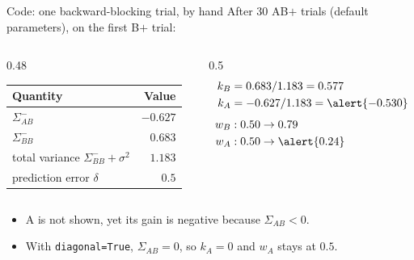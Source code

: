 \documentclass[aspectratio=169,11pt]{beamer}
\begin{document}
\begin{frame}{Code: one backward-blocking trial, by hand}
After 30 AB$+$ trials (default parameters), on the first B$+$ trial:
\vspace{0.5em}
\begin{columns}[T]
\begin{column}{0.48\textwidth}
\centering
\begin{tabular}{lr}
\toprule
Quantity & Value\\
\midrule
$\Sigma^-_{AB}$ & $-0.627$\\
$\Sigma^-_{BB}$ & $0.683$\\
total variance $\Sigma^-_{BB} + \sigma^2$ & $1.183$\\
prediction error $\delta$ & $0.5$\\
\bottomrule
\end{tabular}
\end{column}
\begin{column}{0.5\textwidth}
\begin{align*}
k_B &= 0.683 / 1.183 = 0.577\\
k_A &= -0.627 / 1.183 = \alert{-0.530}\\[4pt]
w_B &: 0.50 \to 0.79\\
w_A &: 0.50 \to \alert{0.24}
\end{align*}
\end{column}
\end{columns}
\vspace{0.8em}
\begin{itemize}\small
\item A is not shown, yet its gain is negative because $\Sigma_{AB} < 0$.
\item With \texttt{diagonal=True}, $\Sigma_{AB} = 0$, so $k_A = 0$ and $w_A$ stays at $0.5$.
\end{itemize}
\end{frame}
\end{document}
